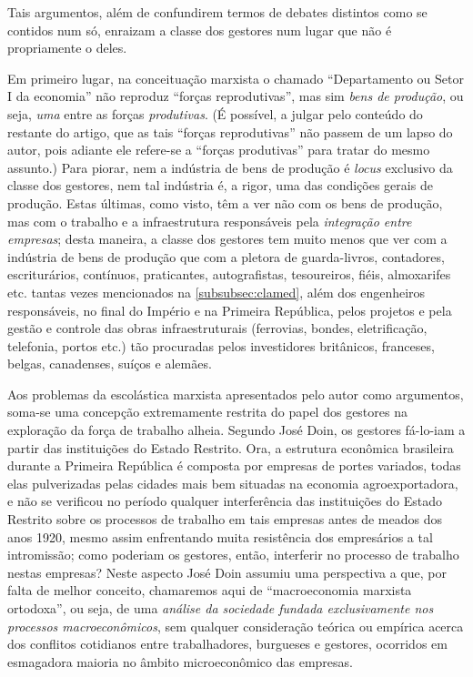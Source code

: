 Tais argumentos, além de confundirem termos de debates distintos como se contidos num só, enraizam a classe dos gestores num lugar que não é propriamente o deles.

Em primeiro lugar, na conceituação marxista o chamado ``Departamento ou Setor I da economia'' não reproduz ``forças reprodutivas'', mas sim \textit{bens de produção}, ou seja, \textit{uma} entre as forças \textit{produtivas}. (É possível, a julgar pelo conteúdo do restante do artigo, que as tais ``forças reprodutivas'' não passem de um lapso do autor, pois adiante ele refere-se a ``forças produtivas'' para tratar do mesmo assunto.) Para piorar, nem a indústria de bens de produção é \textit{locus} exclusivo da classe dos gestores, nem tal indústria é, a rigor, uma das condições gerais de produção. Estas últimas, como visto, têm a ver não com os bens de produção, mas com o trabalho e a infraestrutura responsáveis pela \textit{integração entre empresas}; desta maneira, a classe dos gestores tem muito menos que ver com a indústria de bens de produção que com a pletora de guarda-livros, contadores, escriturários, contínuos, praticantes, autografistas, tesoureiros, fiéis, almoxarifes etc. tantas vezes mencionados na \autoref{subsubsec:clamed}, além dos engenheiros responsáveis, no final do Império e na Primeira República, pelos projetos e pela gestão e controle das obras infraestruturais (ferrovias, bondes, eletrificação, telefonia, portos etc.) tão procuradas pelos investidores britânicos, franceses, belgas, canadenses, suíços e alemães.

Aos problemas da escolástica marxista apresentados pelo autor como argumentos, soma-se uma concepção extremamente restrita do papel dos gestores na exploração da força de trabalho alheia. Segundo José Doin, os gestores fá-lo-iam a partir das instituições do Estado Restrito. Ora, a estrutura econômica brasileira durante a Primeira República é composta por empresas de portes variados, todas elas pulverizadas pelas cidades mais bem situadas na economia agroexportadora, e não se verificou no período qualquer interferência das instituições do Estado Restrito sobre os processos de trabalho em tais empresas antes de meados dos anos 1920, mesmo assim enfrentando muita resistência dos empresários a tal intromissão; como poderiam os gestores, então, interferir no processo de trabalho nestas empresas? Neste aspecto José Doin assumiu uma perspectiva a que, por falta de melhor conceito, chamaremos aqui de ``macroeconomia marxista ortodoxa'', ou seja, de uma \textit{análise da sociedade fundada exclusivamente nos processos macroeconômicos}, sem qualquer consideração teórica ou empírica acerca dos conflitos cotidianos entre trabalhadores, burgueses e gestores, ocorridos em esmagadora maioria no âmbito microeconômico das empresas.

